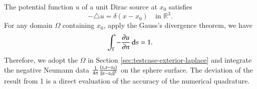 \documentclass[11pt, a4paper]{article}
\begin{document}
The potential function $u$ of a unit Dirac source at $x_0$ satisfies
\begin{equation}
  -\triangle u = \delta(x-x_0) \quad \text{in $\mathbb{R}^3$}.
\end{equation}
For any domain $\Omega$ containing $x_0$, apply the Gauss's divergence theorem, we have
\begin{equation}
  \int_{\Gamma} -\frac{\partial u}{\partial n} \,\mathrm{d} s = 1.
\end{equation}
Therefore, we adopt the $\Omega$ in Section \ref{sec:testcase-exterior-laplace} and
integrate the negative Neumann data $\frac{1}{4\pi}\frac{(x, x-x_0)}{\lVert x-x_0\rVert^3}$ on
the sphere surface. The deviation of the result from 1 is a direct evaluation of the
accuracy of the numerical quadrature.



\listofalgorithms

\lstlistoflistings
\end{document}
